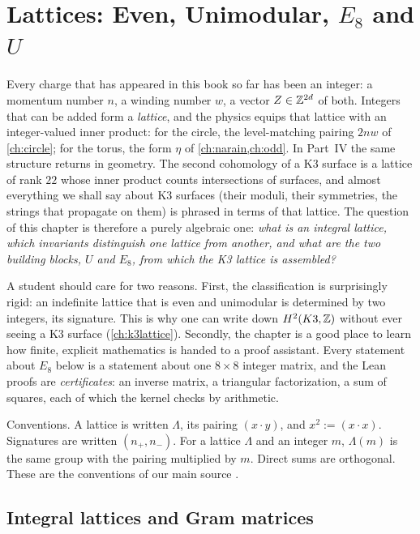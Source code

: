 \chapter{Lattices: Even, Unimodular, \texorpdfstring{$E_8$}{E8} and \texorpdfstring{$U$}{U}}
\label{ch:lattices}

Every charge that has appeared in this book so far has been an integer: a momentum number
$n$, a winding number $w$, a vector $Z\in\mathbb{Z}^{2d}$ of both. Integers that can be added form a
\emph{lattice}, and the physics equips that lattice with an integer-valued inner product: for
the circle, the level-matching pairing $2nw$ of \cref{ch:circle}; for the torus, the form
$\eta$ of \cref{ch:narain,ch:odd}. In Part~IV the same structure returns in geometry. The
second cohomology of a K3 surface is a lattice of rank $22$ whose inner product counts
intersections of surfaces, and almost everything we shall say about K3 surfaces (their
moduli, their symmetries, the strings that propagate on them) is phrased in terms of that
lattice. The question of this chapter is therefore a purely algebraic one: \emph{what is an
integral lattice, which invariants distinguish one lattice from another, and what are the two
building blocks, $U$ and $E_8$, from which the K3 lattice is assembled?}

A student should care for two reasons. First, the classification is surprisingly rigid: an
indefinite lattice that is even and unimodular is determined by two integers, its signature.
This is why one can write down $H^2(K3,\mathbb{Z})$ without ever seeing a K3 surface
(\cref{ch:k3lattice}). Secondly, the chapter is a good place to learn how finite, explicit
mathematics is handed to a proof assistant. Every statement about $E_8$ below is a statement
about one $8\times8$ integer matrix, and the Lean proofs are \emph{certificates}: an inverse
matrix, a triangular factorization, a sum of squares, each of which the kernel checks by
arithmetic.

Conventions. A lattice is written $\Lambda$, its pairing $(x\cdot y)$, and $x^2:=(x\cdot x)$.
Signatures are written $(n_+,n_-)$. For a lattice $\Lambda$ and an integer $m$, $\Lambda(m)$
is the same group with the pairing multiplied by $m$. Direct sums are orthogonal. These are
the conventions of our main source .

\section{Integral lattices and Gram matrices}\label{sec:lattices:gram}

